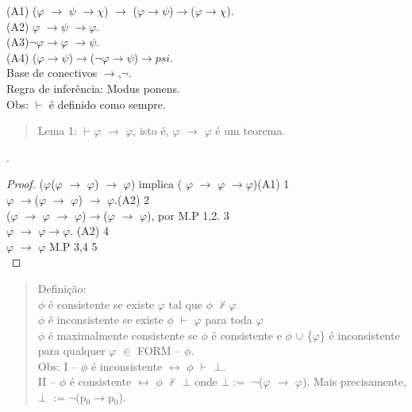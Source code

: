 \documentclass[12pt]{report}
\begin{document}
(A1) ($\varphi$ $\rightarrow$ $\psi$ $\rightarrow$$\chi$) $\rightarrow$ ($\varphi$$\rightarrow$$\psi$)$\rightarrow$($\varphi$$\rightarrow$$\chi$).\\
(A2) $\varphi$ $\rightarrow$$\psi$ $\rightarrow$$\varphi$.\\
(A3)$\neg$$\varphi$$\rightarrow$$\varphi$ $\rightarrow$$\psi$.\\
(A4) ($\varphi$$\rightarrow$$\psi$)$\rightarrow$($\neg$$\varphi$$\rightarrow$$\psi$)$\rightarrow$$psi$.\\
Base de conectivos {$\rightarrow$,$\neg$}.\\
Regra de inferência: Modus ponens.\\
Obs: $\vdash$ é definido como sempre.
\begin{quote}
Lema 1: $\vdash$$\varphi$ $\rightarrow$ $\varphi$, isto é, $\varphi$ $\rightarrow$ $\varphi$ é um teorema.
\end{quote}.
\begin{proof}
($\varphi$($\varphi$ $\rightarrow$ $\varphi$) $\rightarrow$ $\varphi$) implica ( $\varphi$ $\rightarrow$ $\varphi$ $\rightarrow$$\varphi$)(A1) 1\\
$\varphi$ $\rightarrow$($\varphi$ $\rightarrow$ $\varphi$) $\rightarrow$ $\varphi$.(A2) 2\\
($\varphi$ $\rightarrow$ $\varphi$ $\rightarrow$ $\varphi$)$\rightarrow$($\varphi$ $\rightarrow$ $\varphi$), por M.P 1,2.   3\\
$\varphi$ $\rightarrow$ $\varphi$$\rightarrow$$\varphi$. (A2)  4\\
$\varphi$ $\rightarrow$ $\varphi$ M.P 3,4    5\\
\end{proof}
\begin{quote} Definição: \\
$\phi$ é consistente se existe $\varphi$ tal que $\phi$ $\nvdash$$\varphi$ \\
$\phi$ é inconsistente se existe $\phi$ $\vdash$ $\varphi$ para toda $\varphi$ \\
$\phi$ é maximalmente consistente se $\phi$ é consistente e $\phi$ $\cup$ \{$\varphi$\} é inconsistente para qualquer $\varphi$ $\in$ FORM – $\phi$.\\
Obs: I – $\phi$ é inconsistente $\leftrightarrow$ $\phi$ $\vdash$ $\bot$.\\
II – $\phi$ é consistente $\leftrightarrow$ $\phi$ $\nvdash$ $\bot$ onde $\bot$$:=$ $\neg$($\varphi$ $\rightarrow$ $\varphi$). Mais precisamente, $\bot$ $:=$$\neg$(p$_{0}$$\rightarrow$p$_{0}$).
\end{quote}
$$
\end{document}
